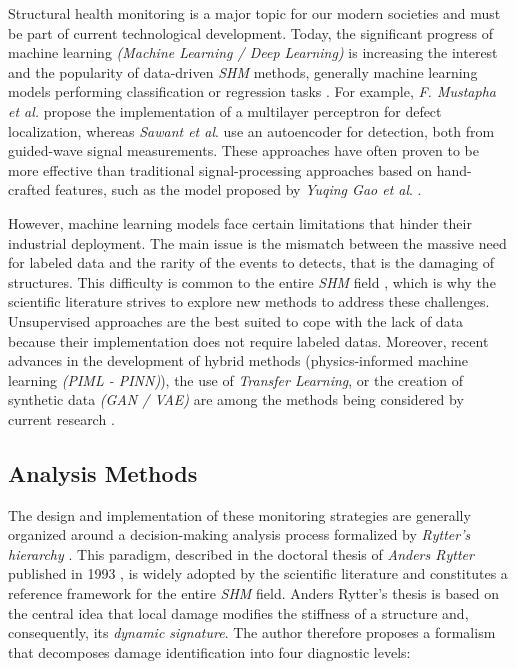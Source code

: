 \documentclass[12pt]{article}
\begin{document}
Structural health monitoring is a major topic for our modern societies and must be part of current technological development. Today, the significant progress of machine learning \textit{(Machine Learning / Deep Learning)} is increasing the interest and the popularity of data-driven \textit{SHM} methods, generally machine learning models performing classification or regression tasks \cite{s25196136, infrastructures11070228, Rizvi_2023}. For example, \textit{F. Mustapha et al.} \cite{MUSTAPHA20071885} propose the implementation of a multilayer perceptron for defect localization, whereas \textit{Sawant et al}. \cite{SAWANT2023106931} use an autoencoder for detection, both from guided-wave signal measurements. These approaches have often proven to be more effective than traditional signal-processing approaches based on hand-crafted features, such as the model proposed by \textit{Yuqing Gao et al}. \cite{GAO2023106889}. 
 
However, machine learning models face certain limitations that hinder their industrial deployment. The main issue is the mismatch between the massive need for labeled data and the rarity of the events to detects, that is the damaging of structures. This difficulty is common to the entire \textit{SHM} field \cite{Rizvi_2023, SAWANT2023106931, s25196136}, which is why the scientific literature strives to explore new methods to address these challenges. Unsupervised approaches are the best suited to cope with the lack of data because their implementation does not require labeled datas. Moreover, recent advances in the development of hybrid methods (physics-informed machine learning \textit{(PIML - PINN)}), the use of \textit{Transfer Learning}, or the creation of synthetic data \textit{(GAN / VAE)} are among the methods being considered by current research \cite{Rizvi_2023, infrastructures11070228}.   
 
\subsection{Analysis Methods}
 
The design and implementation of these monitoring strategies are generally organized around a decision-making analysis process formalized by \textit{Rytter's hierarchy} \cite{s25196136}. This paradigm, described in the doctoral thesis of \textit{Anders Rytter} published in 1993 \cite{rytter1993}, is widely adopted by the scientific literature and constitutes a reference framework for the entire \textit{SHM} field. Anders Rytter's thesis is based on the central idea that local damage modifies the stiffness of a structure and, consequently, its \textit{dynamic signature}. The author therefore proposes a formalism that decomposes damage identification into four diagnostic levels: 
 
\end{document}
